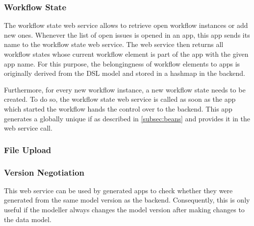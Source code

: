 \subsubsection{Workflow State} 

The workflow state web service allows to retrieve open workflow instances or add new ones. Whenever the list of open issues is opened in an app, this app sends its name to the workflow state web service. The web service then returns all workflow states whose current workflow element is part of the app with the given app name. For this purpose, the belongingness of workflow elements to apps is originally derived from the DSL model and stored in a hashmap in the backend.

Furthermore, for every new workflow instance, a new workflow state needs to be created. To do so, the workflow state web service is called as soon as the app which started the workflow hands the control over to the backend. This app generates a globally unique if as described in \ref{subsec:beans} and provides it in the web service call.

\subsubsection{File Upload} 

\subsubsection{Version Negotiation} 
This web service can be used by generated apps to check whether they were generated from the same model version as the backend. Consequently, this is only useful if the modeller always changes the model version after making changes to the data model.